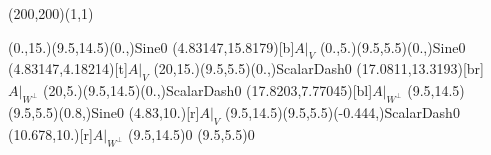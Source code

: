 \unitlength=1bp%

\begin{feynartspicture}(200,200)(1,1)

\FADiagram{}
\FAProp(0.,15.)(9.5,14.5)(0.,){Sine}{0}
\FALabel(4.83147,15.8179)[b]{$A|_V$}
\FAProp(0.,5.)(9.5,5.5)(0.,){Sine}{0}
\FALabel(4.83147,4.18214)[t]{$A|_V$}
\FAProp(20,15.)(9.5,5.5)(0.,){ScalarDash}{0}
\FALabel(17.0811,13.3193)[br]{$A|_{W^\perp}$}
\FAProp(20,5.)(9.5,14.5)(0.,){ScalarDash}{0}
\FALabel(17.8203,7.77045)[bl]{$A|_{W^\perp}$}
\FAProp(9.5,14.5)(9.5,5.5)(0.8,){Sine}{0}
\FALabel(4.83,10.)[r]{$A|_V$}
\FAProp(9.5,14.5)(9.5,5.5)(-0.444,){ScalarDash}{0}
\FALabel(10.678,10.)[r]{$A|_{W^\perp}$}
\FAVert(9.5,14.5){0}
\FAVert(9.5,5.5){0}
\end{feynartspicture}

